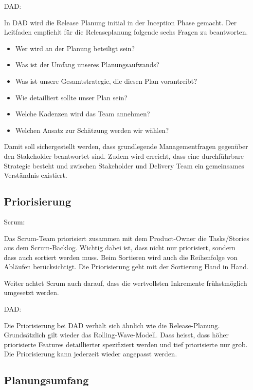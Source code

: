 {\Large DAD:} \cite{planningReleaseDad} \medskip

In DAD wird die Release Planung initial in der Inception Phase gemacht. Der Leitfaden empfiehlt für die Releaseplanung folgende sechs Fragen zu beantworten.
\begin{itemize}
	\item Wer wird an der Planung beteiligt sein?
	\item Was ist der Umfang unseres Planungsaufwands?
	\item Was ist unsere Gesamtstrategie, die diesen Plan vorantreibt?
    \item Wie detailliert sollte unser Plan sein?
    \item Welche Kadenzen wird das Team annehmen?
    \item Welchen Ansatz zur Schätzung werden wir wählen?
\end{itemize}
Damit soll sichergestellt werden, dass grundlegende Managementfragen gegenüber den Stakeholder beantwortet sind. Zudem wird erreicht, dass eine durchführbare Strategie besteht und zwischen Stakeholder und Delivery Team ein gemeinsames Verständnis existiert.


\subsection{Priorisierung}

{\Large Scrum:} \cite{planningPrioScrum} \medskip

Das Scrum-Team priorisiert zusammen mit dem Product-Owner die Tasks/Stories aus dem Scrum-Backlog. Wichtig dabei ist, dass nicht nur priorisiert, sondern dass auch sortiert werden muss. Beim Sortieren wird auch die Reihenfolge von Abläufen berücksichtigt. Die Priorisierung geht mit der Sortierung Hand in Hand. \smallskip

Weiter achtet Scrum auch darauf, dass die wertvollsten Inkremente frühstmöglich umgesetzt werden.\bigskip 

{\Large DAD:} \cite{planningPrioDad} \medskip

Die Priorisierung bei DAD verhält sich ähnlich wie die Release-Planung. Grundsätzlich gilt wieder das Rolling-Wave-Modell. Dass heisst, dass höher priorisierte Features detaillierter spezifiziert werden und tief priorisierte nur grob. Die Priorisierung kann jederzeit wieder angepasst werden.


\subsection{Planungsumfang}

